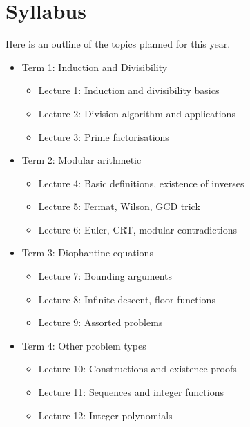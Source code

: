 \documentclass{article}
\begin{document}
\section{Syllabus}
Here is an outline of the topics planned for this year.
\begin{itemize}
  \item Term 1: Induction and Divisibility
    \begin{itemize}
      \item Lecture 1: Induction and divisibility basics
      \item Lecture 2: Division algorithm and applications
      \item Lecture 3: Prime factorisations
    \end{itemize}
  \item Term 2: Modular arithmetic
    \begin{itemize}
      \item Lecture 4: Basic definitions, existence of inverses
      \item Lecture 5: Fermat, Wilson, GCD trick
      \item Lecture 6: Euler, CRT, modular contradictions
    \end{itemize}
  \item Term 3: Diophantine equations
    \begin{itemize}
      \item Lecture 7: Bounding arguments
      \item Lecture 8: Infinite descent, floor functions
      \item Lecture 9: Assorted problems
    \end{itemize}
  \item Term 4: Other problem types
    \begin{itemize}
      \item Lecture 10: Constructions and existence proofs
      \item Lecture 11: Sequences and integer functions
      \item Lecture 12: Integer polynomials
    \end{itemize}
\end{itemize}
\end{document}
